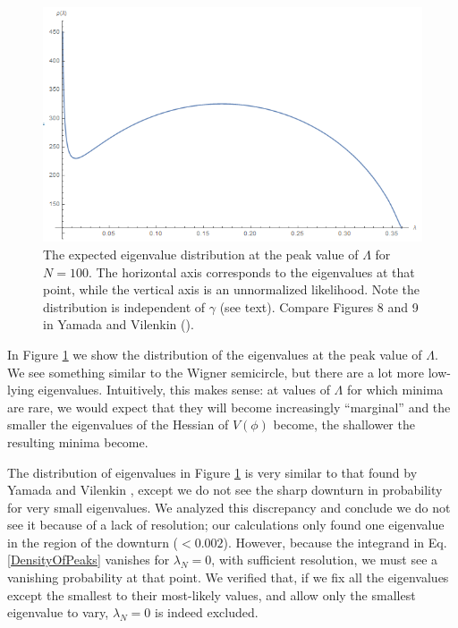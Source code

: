 \documentclass[12pt]{article}
\begin{document}

\begin{figure} 
  \centering
  \includegraphics[width=.9\linewidth]{eigendist.png}
  \caption{The expected eigenvalue distribution at the peak value of $\Lambda$ for $N=100$. The horizontal axis corresponds to the eigenvalues at that point, while the vertical axis is an unnormalized likelihood. Note the distribution is independent of $\gamma$ (see text). Compare Figures 8 and 9 in Yamada and Vilenkin (\cite{Yamada2018}).}
  \label{eigendist}
\end{figure}

In Figure \ref{eigendist} we show the distribution of the eigenvalues at the peak value of $\Lambda$. We see something similar to the Wigner semicircle, but there are a lot more low-lying eigenvalues. Intuitively, this makes sense: at values of $\Lambda$ for which minima are rare, we would expect that they will become increasingly ``marginal'' and the smaller the eigenvalues of the Hessian of $V(\phi)$ become, the shallower the resulting minima become. 

The distribution of eigenvalues in Figure \ref{eigendist} is very similar to that found by Yamada and Vilenkin \cite{Yamada2018}, except we do not see the sharp downturn in probability for very small eigenvalues. We analyzed this discrepancy and conclude we do not see it because of a lack of resolution; our calculations only found one eigenvalue in the region of the downturn ($< 0.002$). However, because the integrand in Eq. \ref{DensityOfPeaks} vanishes for $\lambda_N=0$, with sufficient resolution, we must see a vanishing probability at that point. We verified that, if we fix all the eigenvalues except the smallest to their most-likely values, and allow only the smallest eigenvalue to vary, $\lambda_N=0$ is indeed excluded.
\end{document}

